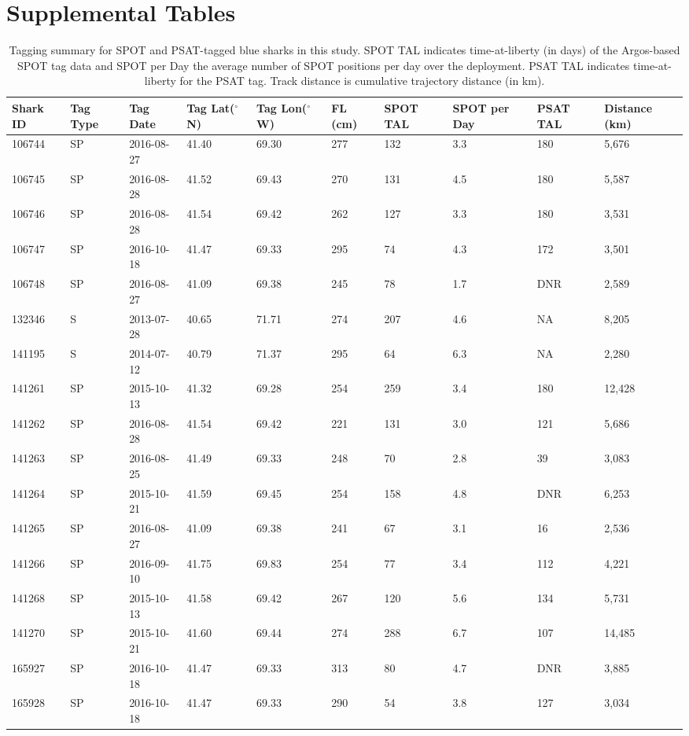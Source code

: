 \section{Supplemental Tables}

\clearpage
\begin{landscape}
\begin{table}
\caption[Tagging summary for SPOT and PSAT-tagged blue sharks in the Gulf Stream]{Tagging summary for SPOT and PSAT-tagged blue sharks in this study. SPOT TAL indicates time-at-liberty (in days) of the Argos-based SPOT tag data and SPOT per Day the average number of SPOT positions per day over the deployment. PSAT TAL indicates time-at-liberty for the PSAT tag. Track distance is cumulative trajectory distance (in km).}
\label{tab:a5t1}
\centering
\begin{tabular}{p{1.5cm} p{.8cm} p{2cm} p{1.5cm} p{1.5cm} p{1cm} p{1cm} p{1cm} p{1cm} p{2cm}}
\toprule
Shark ID & Tag Type & Tag Date & Tag Lat($^\circ$N) & Tag Lon($^\circ$W) & FL (cm) & SPOT TAL & SPOT per Day & PSAT TAL & Distance (km)\\
\midrule
106744 & SP & 2016-08-27 & 41.40 & 69.30 & 277 & 132 & 3.3 & 180 & 5,676\\
106745 & SP & 2016-08-28 & 41.52 & 69.43 & 270 & 131 & 4.5 & 180 & 5,587\\
106746 & SP & 2016-08-28 & 41.54 & 69.42 & 262 & 127 & 3.3 & 180 & 3,531\\
106747 & SP & 2016-10-18 & 41.47 & 69.33 & 295 & 74 & 4.3 & 172 & 3,501\\
106748 & SP & 2016-08-27 & 41.09 & 69.38 & 245 & 78 & 1.7 & DNR & 2,589\\
132346 & S & 2013-07-28 & 40.65 & 71.71 & 274 & 207 & 4.6 & NA  & 8,205\\
141195 & S & 2014-07-12 & 40.79 & 71.37 & 295 & 64 & 6.3 & NA & 2,280\\
141261 & SP & 2015-10-13 & 41.32 & 69.28 & 254 & 259 & 3.4 & 180 & 12,428\\
141262 & SP & 2016-08-28 & 41.54 & 69.42 & 221 & 131 & 3.0 & 121 & 5,686\\
141263 & SP & 2016-08-25 & 41.49 & 69.33 & 248 & 70 & 2.8 & 39 & 3,083\\
141264 & SP & 2015-10-21 & 41.59 & 69.45 & 254 & 158 & 4.8 & DNR & 6,253\\
141265 & SP & 2016-08-27 & 41.09 & 69.38 & 241 & 67 & 3.1 & 16 & 2,536\\
141266 & SP & 2016-09-10 & 41.75 & 69.83 & 254 & 77 & 3.4 & 112 & 4,221\\
141268 & SP & 2015-10-13 & 41.58 & 69.42 & 267 & 120 & 5.6 & 134 & 5,731\\
141270 & SP & 2015-10-21 & 41.60 & 69.44 & 274 & 288 & 6.7 & 107 & 14,485\\
165927 & SP & 2016-10-18 & 41.47 & 69.33 & 313 & 80 & 4.7 & DNR & 3,885\\
165928 & SP & 2016-10-18 & 41.47 & 69.33 & 290 & 54 & 3.8 & 127 & 3,034\\
\bottomrule
\end{tabular}
\end{table}
\end{landscape}

